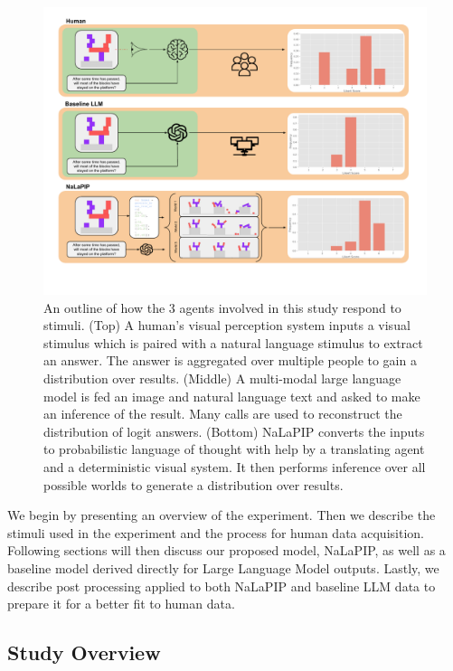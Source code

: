 \documentclass[10pt,letterpaper]{article}
\begin{document}
\begin{figure}[ht]
    \centering
    \includegraphics[scale=0.75]{images/966_diagram1.pdf}
    \caption{An outline of how the 3 agents involved in this study respond to stimuli. (Top) A human's visual perception system inputs a visual stimulus which is paired with a natural language stimulus to extract an answer. The answer is aggregated over multiple people to gain a distribution over results. (Middle) A multi-modal large language model is fed an image and natural language text and asked to make an inference of the result. Many calls are used to reconstruct the distribution of logit answers. (Bottom) NaLaPIP converts the inputs to probabilistic language of thought with help by a translating agent and a deterministic visual system. It then performs inference over all possible worlds to generate a distribution over results.}
    \label{fig:NaLaPIP}
\end{figure}

We begin by presenting an overview of the experiment. Then we describe the stimuli used in the experiment and the process for human data acquisition. Following sections will then discuss our proposed model, NaLaPIP, as well as a baseline model derived directly for Large Language Model outputs. Lastly, we describe post processing applied to both NaLaPIP and baseline LLM data to prepare it for a better fit to human data.

\subsection{Study Overview}
\end{document}
